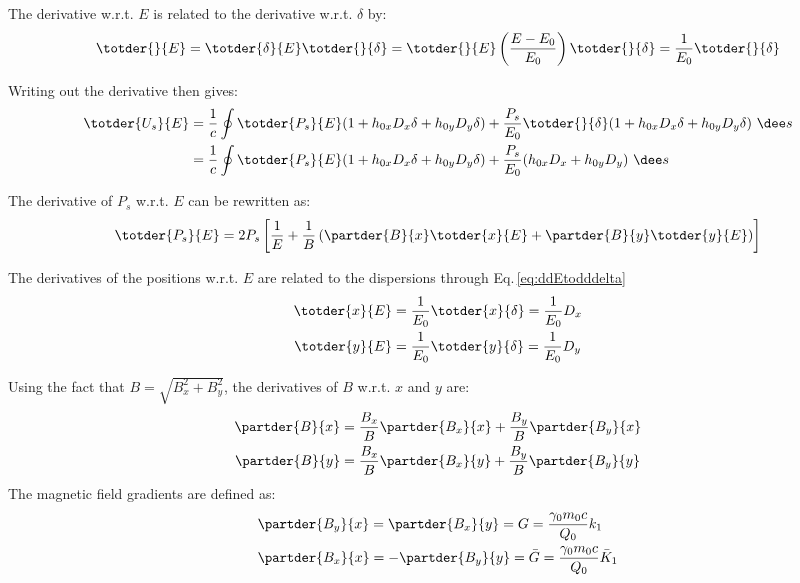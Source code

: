 The derivative w.r.t. $E$ is related to the derivative w.r.t. $\delta$ by:
\begin{equation}
    \totder{}{E} = \totder{\delta}{E} \totder{}{\delta} = \totder{}{E} \left( \frac{E - E_0}{E_0} \right) \totder{}{\delta} = \frac{1}{E_0} \totder{}{\delta}
    \label{eq:ddEtodddelta}
\end{equation}

Writing out the derivative then gives:
\begin{align}
    \totder{U_s}{E} &= \frac{1}{c} \oint \totder{P_s}{E} (1 + h_{0x}D_x \delta + h_{0y} D_y \delta) + \frac{P_s}{E_0} \totder{}{\delta}(1 + h_{0x}D_x \delta + h_{0y} D_y \delta)\ \dee s \notag \\
                    &= \frac{1}{c} \oint \totder{P_s}{E} (1 + h_{0x}D_x \delta + h_{0y} D_y \delta) + \frac{P_s}{E_0} (h_{0x}D_x + h_{0y} D_y)\ \dee s
\end{align}

The derivative of $P_s$ w.r.t. $E$ can be rewritten as:
\begin{equation}
    \totder{P_s}{E} = 2 P_s \left[ \frac{1}{E} + \frac{1}{B} \left( \partder{B}{x} \totder{x}{E} + \partder{B}{y} \totder{y}{E} \right) \right]
\end{equation}

The derivatives of the positions w.r.t. $E$ are related to the dispersions through Eq.\,\ref{eq:ddEtodddelta}
\begin{align}
    \totder{x}{E} &= \frac{1}{E_0} \totder{x}{\delta} = \frac{1}{E_0} D_x\\
    \totder{y}{E} &= \frac{1}{E_0} \totder{y}{\delta} = \frac{1}{E_0} D_y
\end{align}

Using the fact that $B = \sqrt{B_x^2 + B_y^2}$, the derivatives of $B$ w.r.t. $x$ and $y$ are:
\begin{align}
    \partder{B}{x} &= \frac{B_x}{B} \partder{B_x}{x} + \frac{B_y}{B} \partder{B_y}{x}\\
    \partder{B}{y} &= \frac{B_x}{B} \partder{B_x}{y} + \frac{B_y}{B} \partder{B_y}{y}
\end{align}
The magnetic field gradients are defined as:
\begin{align}
    &\partder{B_y}{x} = \partder{B_x}{y}  = G       = \frac{\gamma_0 m_0 c}{Q_0} k_1\\
    &\partder{B_x}{x} = -\partder{B_y}{y} = \bar{G} = \frac{\gamma_0 m_0 c}{Q_0} \bar{K}_1
\end{align}

